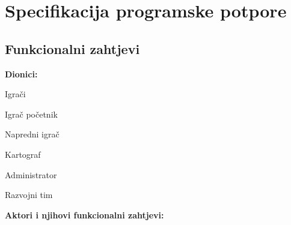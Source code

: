 \chapter{Specifikacija programske potpore}
		
	\section{Funkcionalni zahtjevi}
			
			\noindent \textbf{Dionici:}
			
			\begin{packed_enum}
				
				\item Igrači
				\begin{packed_enum}
				    \item Igrač početnik
				    \item Napredni igrač
				\end{packed_enum}
				\item Kartograf				
				\item Administrator
				\item Razvojni tim
				
			\end{packed_enum}
			
			\noindent \textbf{Aktori i njihovi funkcionalni zahtjevi:}
			
